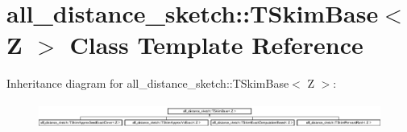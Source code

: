 \hypertarget{classall__distance__sketch_1_1TSkimBase}{}\section{all\+\_\+distance\+\_\+sketch\+:\+:T\+Skim\+Base$<$ Z $>$ Class Template Reference}
\label{classall__distance__sketch_1_1TSkimBase}
Inheritance diagram for all\+\_\+distance\+\_\+sketch\+:\+:T\+Skim\+Base$<$ Z $>$\+:\begin{figure}[H]
\begin{center}
\leavevmode
\includegraphics[height=0.828402cm]{classall__distance__sketch_1_1TSkimBase}
\end{center}
\end{figure}

